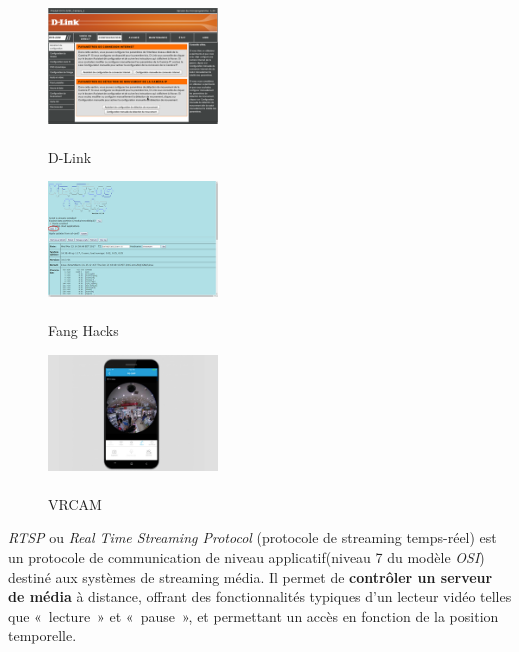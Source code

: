 \begin{minipage}{0.3265\textwidth}
\begin{figure}[H]
	\centering
	\includegraphics[width=4.5cm]{img/d-link_web.png}
    \caption{\\D-Link}
\end{figure}
\end{minipage}
\begin{minipage}{0.3265\textwidth}
\begin{figure}[H]
	\centering
	\includegraphics[width=4.5cm]{img/fanghacks.png}
    \caption{\\Fang Hacks}
\end{figure}
\end{minipage}
\begin{minipage}{0.3265\textwidth}
\begin{figure}[H]
	\centering
	\includegraphics[width=4.5cm]{img/vrcam_mob.png}
    \caption{\\VRCAM}
\end{figure}
\end{minipage}
        
\textit{RTSP} ou \textit{Real Time Streaming Protocol} (protocole de streaming temps-réel) est un protocole de communication de niveau applicatif(niveau 7 du modèle \textit{OSI}) destiné aux systèmes de streaming média. Il permet de \textbf{contrôler un serveur de média} à distance, offrant des fonctionnalités typiques d'un lecteur vidéo telles que «~lecture~» et «~pause~», et permettant un accès en fonction de la position temporelle.~\cite{RTSPwiki}

